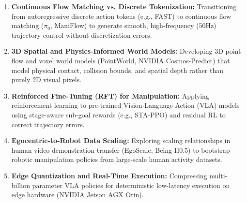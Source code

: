 \documentclass[11pt,a4paper]{article}
\begin{document}
\begin{enumerate}
    \item \textbf{Continuous Flow Matching vs. Discrete Tokenization:} Transitioning from autoregressive discrete action tokens (e.g., FAST) to continuous flow matching ($\pi_0$, ManiFlow) to generate smooth, high-frequency (50Hz) trajectory control without discretization errors.
    \item \textbf{3D Spatial and Physics-Informed World Models:} Developing 3D point-flow and voxel world models (PointWorld, NVIDIA Cosmos-Predict) that model physical contact, collision bounds, and spatial depth rather than purely 2D visual pixels.
    \item \textbf{Reinforced Fine-Tuning (RFT) for Manipulation:} Applying reinforcement learning to pre-trained Vision-Language-Action (VLA) models using stage-aware sub-goal rewards (e.g., STA-PPO) and residual RL to correct trajectory errors.
    \item \textbf{Egocentric-to-Robot Data Scaling:} Exploring scaling relationships in human video demonstration transfer (EgoScale, Being-H0.5) to bootstrap robotic manipulation policies from large-scale human activity datasets.
    \item \textbf{Edge Quantization and Real-Time Execution:} Compressing multi-billion parameter VLA policies for deterministic low-latency execution on edge hardware (NVIDIA Jetson AGX Orin).
\end{enumerate}
\end{document}

